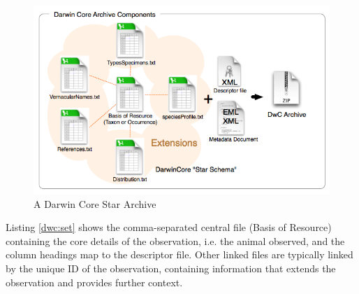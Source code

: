     \begin{figure}
    \centering
      \includegraphics[width=\textwidth]{Chap5/figures/dwca.png}
    \caption{A Darwin Core Star Archive \cite{wieczorek2012}}
    \label{dwca}
    \end{figure}

Listing \ref{dwc:set} shows the comma-separated central file (Basis of Resource) containing the core details of the observation, i.e. the animal observed, and the column headings map to the descriptor file. Other linked files are typically linked by the unique ID of the observation, containing information that extends the observation and provides further context.

\noindent\begin{minipage}{\textwidth}

\end{minipage}



% 


